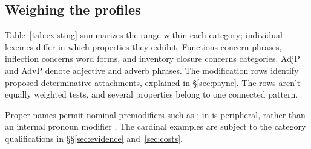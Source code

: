 \documentclass[12pt]{article}
\begin{document}
\subsection{Weighing the profiles}\label{sec:membership}

Table~\ref{tab:existing} summarizes the range within each category; individual lexemes differ in which properties they exhibit. Functions concern phrases, inflection concerns word forms, and inventory closure concerns categories. AdjP and AdvP denote adjective and adverb phrases. The modification rows identify proposed determinative attachments, explained in §\ref{sec:payne}. The rows aren't equally weighted tests, and several properties belong to one connected pattern.

Proper names permit nominal premodifiers such as ;  in  is peripheral, rather than an internal pronoun modifier \citep[429--430, 519--520]{huddleston2002}. The cardinal examples are subject to the category qualifications in §§\ref{sec:evidence} and~\ref{sec:costs}.
\end{document}
